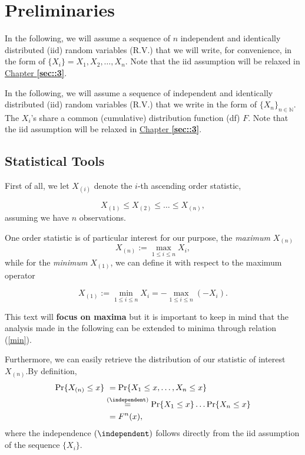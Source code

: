 
\section{Preliminaries}\label{sec::1.1}


In the following, we will assume a sequence of $n$ independent and identically distributed (iid) random variables (R.V.) that we will write, for convenience, in the form of $\{X_i\}=X_1,X_2,\dots ,X_n$. Note that the iid assumption will be relaxed in \hyperref[sec::3]{Chapter \textbf{\ref{sec::3}}}.

In the following, we will assume a sequence of independent and identically distributed (iid) random variables (R.V.) that we write in the form of $\{X_n\}_{n\in\mathbb{N}}$. The $X_i$'s share a common (cumulative) distribution function (df) $F$. Note that the iid assumption will be relaxed in \hyperref[sec::3]{Chapter \textbf{\ref{sec::3}}}.


\subsection*{Statistical Tools}
First of all, we let $X_{(i)} $ denote the $i$-th ascending order statistic,

\begin{equation} \label{ordereds}
X_{(1)}\leq X_{(2)}\leq \ldots \leq X_{(n)},
\end{equation}
assuming we have $n$ observations.

One order statistic is of particular interest for our purpose, the \emph{maximum} $X_{(n)}$
\begin{equation} \label{max}
X_{(n)}:=\displaystyle{\max_{1\leq i\leq n}}X_i,
\end{equation}
while for the \emph{minimum} $X_{(1)}$, we can define it with respect to the maximum operator

\begin{equation}\label{min}
X_{(1)}:=\displaystyle{\min_{1\leq i\leq n}}X_i=- \displaystyle{\max_{1\leq i\leq n}}(-X_i).
\end{equation}

This text will \textbf{focus on maxima} but it is important to keep in mind that the analysis made in the following can be extended to minima through relation (\ref{min}).

Furthermore, we can easily retrieve the distribution of our statistic of interest $X_{(n)}$.By definition,
\begin{equation}\label{maxdist}
\begin{aligned}
\text{Pr}\{X_{(n)}\leq x\} & \ =\text{Pr}\{X_1 \leq x, \ldots, X_n \leq x\} \\ &\stackrel{(\independent)}{=}\text{Pr}\{X_1\leq x\}\dots\text{Pr}\{X_n\leq x\} \\
&\ =F^n(x),
\end{aligned}
\end{equation}
where the independence $(\independent)$  follows directly from the iid assumption of the sequence $\{X_i\}$.


